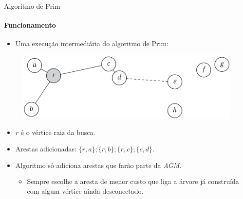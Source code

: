 \begin{frame}{Algoritmo de Prim}
	\framesubtitle{Funcionamento}
	
	\begin{itemize}
		\item Uma execução intermediária do algoritmo de Prim:
	\end{itemize}

	\begin{figure}
		\centering
		\includegraphics[width=0.7\linewidth]{img/execucao-prim}
	\end{figure}
	

	\begin{itemize}
		\item $r$ é o vértice raiz da busca.
		\item Arestas adicionadas: $\{r, a\}; \{r, b\}; \{r, c\}; \{c, d\}$.
		\item Algoritmo só adiciona arestas que farão parte da \textit{AGM}.
		\begin{itemize}
			\item Sempre escolhe a aresta de menor custo que liga a árvore já construída com algum vértice ainda desconectado.
		\end{itemize}
	\end{itemize}
\end{frame}



